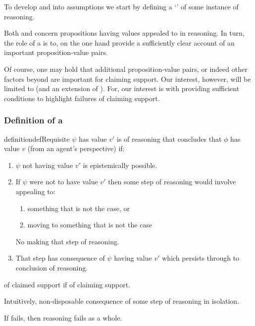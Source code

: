 \begin{note}
  To develop \ideaCSA{} and \ideaCSB{} into assumptions we start by defining a `\requ{}' of some instance of reasoning.

  Both \ideaCSA{} and \ideaCSB{} concern propositions having values appealed to in reasoning.
  In turn, the role of a \requ{} is to, on the one hand provide a sufficiently clear account of an important proposition-value pairs.

  Of course, one may hold that additional proposition-value pairs, or indeed other factors beyond  are important for claiming support.
  Our interest, however, will be limited to  (and an extension of ).
  For, our interest is with providing sufficient conditions to highlight failures of claiming support.
\end{note}

\subsubsection{Definition of a }
\label{sec:def-of-requ}

\begin{note}
  \begin{restatable}{definition}{defRequisite}\label{def:requisite}
    \(\psi\) has value \(v'\) is \requ{} of reasoning that concludes that \(\phi\) has value \(v\) (from an agent's perspective) if:
    \begin{enumerate}
    \item\label{def:requi:not-v-poss} \(\psi\) not having value \(v'\) is epistemically possible.
    \item\label{def:requi:counterfactual} If \(\psi\) were not to have value \(v'\) then some step of reasoning would involve appealing to:
      \begin{enumerate}
      \item\label{def:requi:counterfactual:p} something that is not the case, or
      \item\label{def:requi:counterfactual:c} moving to something that is not the case
      \end{enumerate}
      No making that step of reasoning.
    \item\label{def:requi:conseq-persists} That step has consequence of \(\psi\) having value \(v'\) which persists through to conclusion of reasoning.
    \end{enumerate}

     of claimed support if \requ{} of claiming support.
  \end{restatable}
  Intuitively, non-disposable consequence of some step of reasoning in isolation.

  If \requ{} fails, then reasoning fails as a whole.
\end{note}

